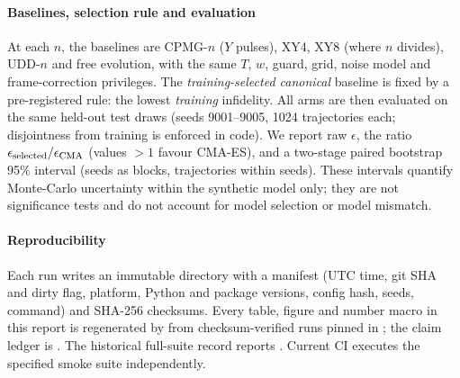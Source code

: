 \paragraph{Baselines, selection rule and evaluation} At each $n$, the baselines are CPMG-$n$
($Y$ pulses), XY4, XY8 (where $n$ divides), UDD-$n$ and free evolution, with the same $T$, $w$,
guard, grid, noise model and frame-correction privileges. The \emph{training-selected canonical} baseline is fixed
by a pre-registered rule: the lowest \emph{training} infidelity. All arms are then evaluated on
the same held-out test draws (seeds 9001--9005, 1024 trajectories each; disjointness from
training is enforced in code). We report raw $\epsilon$, the ratio
$\epsilon_{\rm selected}/\epsilon_{\rm CMA}$ (values $>1$ favour CMA-ES), and a two-stage paired
bootstrap 95\% interval (seeds as blocks, trajectories within seeds). These intervals quantify
Monte-Carlo uncertainty within the synthetic model only; they are not significance tests and do
not account for model selection or model mismatch.

\paragraph{Reproducibility} Each run writes an immutable  directory
with a manifest (UTC time, git SHA and dirty flag, platform, Python and package versions, config
hash, seeds, command) and SHA-256 checksums. Every table, figure and number macro in this report
is regenerated by  from checksum-verified runs pinned
in ; the claim ledger is .
The historical full-suite record reports \GenTestSummary. Current CI executes the specified smoke suite independently.
